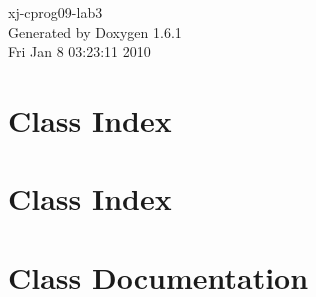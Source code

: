 \documentclass[a4paper]{book}
\begin{document}
\hypersetup{pageanchor=false}
\begin{titlepage}
\vspace*{7cm}
\begin{center}
{\Large xj-\/cprog09-\/lab3 }\\
\vspace*{1cm}
{\large Generated by Doxygen 1.6.1}\\
\vspace*{0.5cm}
{\small Fri Jan 8 03:23:11 2010}\\
\end{center}
\end{titlepage}
\clearemptydoublepage
{}
\tableofcontents
\clearemptydoublepage
{}
\hypersetup{pageanchor=true}
\chapter{Class Index}

\chapter{Class Index}

\chapter{Class Documentation}

























\printindex
\end{document}
